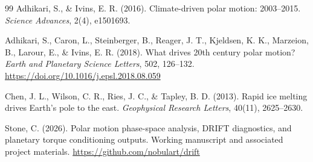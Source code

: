 \documentclass[twocolumn,9pt]{revtex4-2}
\begin{document}
\begin{thebibliography}{99}
Adhikari, S., \& Ivins, E. R. (2016).
Climate-driven polar motion: 2003--2015.
\textit{Science Advances}, 2(4), e1501693.

Adhikari, S., Caron, L., Steinberger, B., Reager, J. T., Kjeldsen, K. K., Marzeion, B., Larour, E., \& Ivins, E. R. (2018).
What drives 20th century polar motion?
\textit{Earth and Planetary Science Letters}, 502, 126--132.
\url{https://doi.org/10.1016/j.epsl.2018.08.059}

Chen, J. L., Wilson, C. R., Ries, J. C., \& Tapley, B. D. (2013).
Rapid ice melting drives Earth's pole to the east.
\textit{Geophysical Research Letters}, 40(11), 2625--2630.

Stone, C. (2026).
Polar motion phase-space analysis, DRIFT diagnostics, and planetary torque conditioning outputs.
Working manuscript and associated project materials.
\url{https://github.com/nobulart/drift}

\end{thebibliography}
\end{document}
